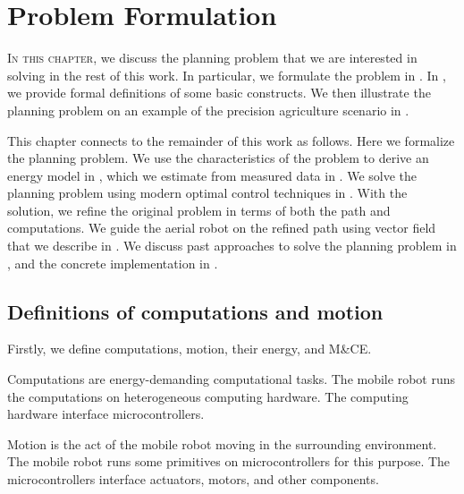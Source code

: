 
\chapter{Problem Formulation}
\label{sec:pb-form}

\lettrine{I}{n this chapter}, we discuss the planning problem that we are interested in solving in the rest of this work. In particular, we formulate the problem in . In , we provide formal definitions of some basic constructs. We then illustrate the planning problem on an example of the precision agriculture scenario in .

This chapter connects to the remainder of this work as follows. Here we formalize the planning problem. We use the characteristics of the problem to derive an energy model in , which we estimate from measured data in . We solve the planning problem using modern optimal control techniques in . With the solution, we refine the original problem in terms of both the path and computations. We guide the aerial robot on the refined path using vector field that we describe in . We discuss past approaches to solve the planning problem in , and the concrete implementation in .


\section{Definitions of computations and motion}
\label{sec:definitions}

Firstly, we define computations, motion, their energy, and M\&CE.

\begin{highlight}
  \begin{defn}\label{def:comps}
    Computations are energy-demanding computational tasks. The mobile robot runs the computations on heterogeneous computing hardware. The computing hardware interface microcontrollers.
    
    Motion is the act of the mobile robot moving in the surrounding environment. The mobile robot runs some primitives on microcontrollers for this purpose. The microcontrollers interface actuators, motors, and other components.%
  \end{defn}
\end{highlight}

